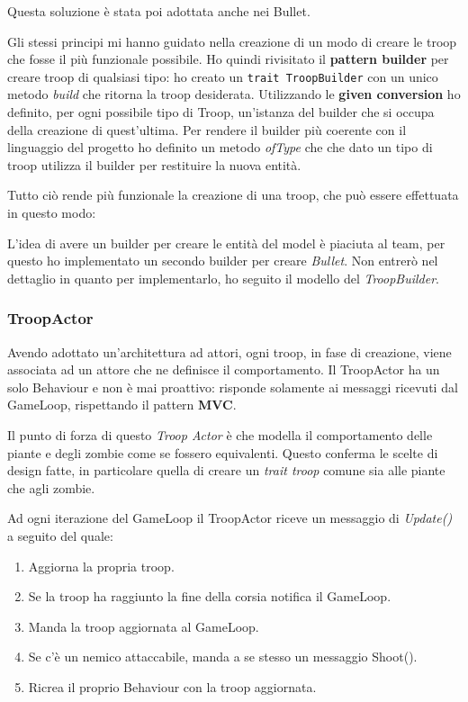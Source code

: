 

Questa soluzione è stata poi adottata anche nei Bullet.

Gli stessi principi mi hanno guidato nella creazione di un modo di creare le troop che fosse il più funzionale possibile.
Ho quindi rivisitato il \textbf{pattern builder} per creare troop di qualsiasi tipo: ho creato un \texttt{trait TroopBuilder}
con un unico metodo \textit{build} che ritorna la troop desiderata.
Utilizzando le \textbf{given conversion} ho definito, per ogni possibile tipo di Troop, un'istanza del builder che si occupa
della creazione di quest'ultima.
Per rendere il builder più coerente con il linguaggio del progetto ho definito un metodo \textit{ofType} che che dato un tipo
di troop utilizza il builder per restituire la nuova entità.



Tutto ciò rende più funzionale la creazione di una troop, che può essere effettuata in questo modo:



L'idea di avere un builder per creare le entità del model è piaciuta al team, per questo ho implementato un secondo builder per creare \textit{Bullet}.
Non entrerò nel dettaglio in quanto per implementarlo, ho seguito il modello del \textit{TroopBuilder}.

\subsubsection{TroopActor}
Avendo adottato un'architettura ad attori, ogni troop, in fase di creazione, viene associata ad un attore che ne definisce il comportamento.
Il TroopActor ha un solo Behaviour e non è mai proattivo: risponde solamente ai messaggi ricevuti dal GameLoop, rispettando il pattern \textbf{MVC}.

Il punto di forza di questo \textit{Troop Actor} è che modella il comportamento delle piante e degli zombie come se fossero equivalenti.
Questo conferma le scelte di design fatte, in particolare quella di creare un \textit{trait troop} comune sia alle piante che agli zombie.

Ad ogni iterazione del GameLoop il TroopActor riceve un messaggio di \textit{Update()} a seguito del quale:
\begin{enumerate}
    \item Aggiorna la propria troop.
    \item Se la troop ha raggiunto la fine della corsia notifica il GameLoop.
    \item Manda la troop aggiornata al GameLoop.
    \item Se c'è un nemico attaccabile, manda a se stesso un messaggio Shoot().
    \item Ricrea il proprio Behaviour con la troop aggiornata.
\end{enumerate}

